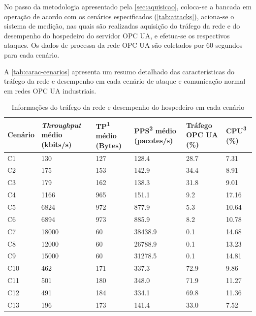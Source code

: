 No passo da metodologia apresentado pela \autoref{sec:aquisicao}, coloca-se a bancada em operação de acordo com os cenários especificados (\autoref{tab:attacks}), aciona-se o sistema de medição, nas quais são realizadas aquisição do tráfego da rede e do desempenho do hospedeiro do servidor OPC UA, e efetua-se os respectivos ataques. Os dados de processa da rede OPC UA são coletados por 60 segundos para cada cenário.

A \autoref{tab:carac-cenarios} apresenta um resumo detalhado das características do tráfego da rede e desempenho em cada cenário de ataque e comunicação normal em redes OPC UA industriais.

\begin{table}[htbp!]
    \centering
    \caption{Informações do tráfego da rede e desempenho do hospedeiro em cada cenário}%
    \label{tab:carac-cenarios}
    \begin{tabular}{M{1.5cm}M{3cm}M{2.5cm}M{2.5cm}M{2cm}M{2cm}}
        \toprule
        \textbf{Cenário} & \textbf{\textit{Throughput} médio (kbits/s)} & \textbf{TP\textsuperscript{1} médio (Bytes)} & \textbf{PPS\textsuperscript{2} médio (pacotes/s)} & \textbf{Tráfego OPC UA (\%)} & \textbf{CPU\textsuperscript{3} (\%)} \\
        \toprule
        C1 & 130 & 127 & 128.4 & 28.7 & 7.31 \\
        \midrule
        C2 & 175 & 153 & 142.9 & 34.4 & 8.91 \\
        \midrule
        C3 & 179 & 162 & 138.3 & 31.8 & 9.01 \\
        \midrule
        C4 & 1166 & 965 & 151.1 & 9.2 & 17.16 \\
        \midrule
        C5 & 6824 & 972 & 877.9 & 5.3 & 10.64 \\
        \midrule
        C6 & 6894 & 973 & 885.9 & 8.2 & 10.78 \\
        \midrule
        C7 & 18000 & 60 & 38438.9 & 0.1 & 14.68 \\
        \midrule
        C8 & 12000 & 60 & 26788.9 & 0.1 & 13.23 \\
        \midrule
        C9 & 15000 & 60 & 31278.5 & 0.1 & 14.81 \\
        \midrule
        C10 & 462 & 171 & 337.3 & 72.9 & 9.86 \\
        \midrule
        C11 & 501 & 180 & 348.0 & 71.9 & 11.27 \\
        \midrule
        C12 & 491 & 184 & 334.1 & 69.8 & 11.36 \\
        \midrule
        C13 & 196 & 173 & 141.4 & 33.0 & 7.52 \\

\end{tabular}
\end{table}
